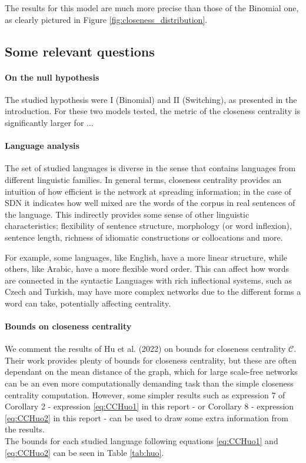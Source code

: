 The results for this model are much more precise than those of the Binomial one, as clearly pictured in Figure \ref{fig:closeness_distribution}.

\subsection{Some relevant questions}
\paragraph{On the null hypothesis} The studied hypothesis were I (Binomial) and II (Switching), as presented in the introduction. For these two models tested, the metric of the closeness centrality is significantly larger for ...

\paragraph{Language analysis} The set of studied languages is diverse in the sense that contains languages from different linguistic families. In general terms, closeness centrality provides an intuition of how efficient is the network at spreading information; in the case of SDN it indicates how well mixed are the words of the corpus in real sentences of the language. This indirectly provides some sense of other linguistic characteristics; flexibility of sentence structure, morphology (or word inflexion), sentence length, richness of idiomatic constructions or collocations and more.

For example, some languages, like English, have a more linear structure, while others, like Arabic, have a more flexible word order. This can affect how words are connected in the syntactic
Languages with rich inflectional systems, such as Czech and Turkish, may have more complex networks due to the different forms a word can take, potentially affecting centrality.

\paragraph{Bounds on closeness centrality \label{sec:bounds}} We comment the results of Hu et al. (2022) \cite{hu2022bounds} on bounds for closeness centrality $\mathcal{C}$. Their work provides plenty of bounds for closeness centrality, but these are often dependant on the mean distance of the graph, which for large scale-free networks can be an even more computationally demanding task than the simple closeness centrality computation. However, some simpler results such as expression 7 of Corollary 2 - expression \eqref{eq:CCHuo1} in this report - or Corollary 8  - expression \eqref{eq:CCHuo2} in this report - can be used to draw some extra information from the results.\\
The bounds for each studied language following equations \eqref{eq:CCHuo1} and \eqref{eq:CCHuo2} can be seen in Table \ref{tab:huo}.

